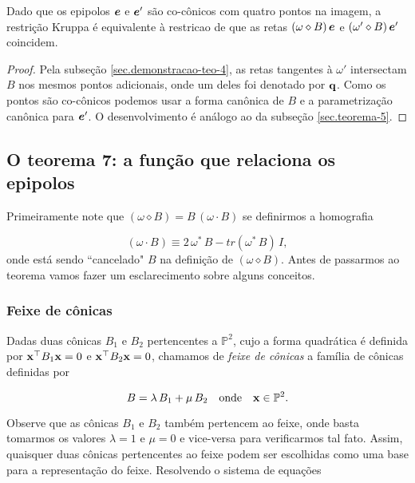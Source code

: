 \begin{teorema}
Dado que os epipolos $\boldsymbol{e}$ e $\boldsymbol{e}'$ são co-cônicos com quatro pontos na imagem, a restrição Kruppa é equivalente à restricao de que as retas $(\omega\diamond B)\,\boldsymbol{e}$ e $(\omega'\diamond B)\,\boldsymbol{e}'$ coincidem.
\end{teorema}

\begin{proof}
Pela subseção \ref{sec.demonstracao-teo-4}, as retas tangentes à $\omega'$ intersectam $B$ nos mesmos pontos adicionais, onde um deles foi denotado por ${\bf q}$. Como os pontos são co-cônicos podemos usar a forma canônica de $B$ e a parametrização canônica para $\boldsymbol{e}'$. O desenvolvimento é análogo ao da subseção \ref{sec.teorema-5}.
\end{proof}

\subsection{O teorema 7: a função que relaciona os epipolos}


Primeiramente note que $(\omega \diamond B) = B\,(\omega \cdot B)$ se definirmos a homografia

\begin{equation}
(\omega \cdot B) \equiv 2\,\omega^*\,B - tr(\omega^*\,B)\,I,
\end{equation}
onde está sendo ``cancelado" $B$ na definição de $(\omega \diamond B)$. Antes de passarmos ao teorema vamos fazer um esclarecimento sobre alguns conceitos. 

\subsubsection{Feixe de cônicas}\label{sec.feixe-conicas}

Dadas duas cônicas $B_1$ e $B_2$ pertencentes a $\mathbb{P}^2$, cujo a forma quadrática é definida por $\mathbf{x}^\top B_1\mathbf{x}=0$ e $\mathbf{x}^\top B_2\mathbf{x}=0$, chamamos de \textit{feixe de cônicas} a família de cônicas definidas por

\begin{equation}\label{eq.B-combinacao-B1-B2}
B=\lambda\,B_1+\mu\,B_2\quad\text{onde}\quad\mathbf{x}\in\mathbb{P}^2.
\end{equation}

Observe que as cônicas $B_1$ e $B_2$ também pertencem ao feixe, onde basta tomarmos os valores $\lambda=1$ e $\mu=0$ e vice-versa para verificarmos tal fato. Assim, quaisquer duas cônicas pertencentes ao feixe podem ser escolhidas como uma base para a representação do feixe. Resolvendo o sistema de equações

